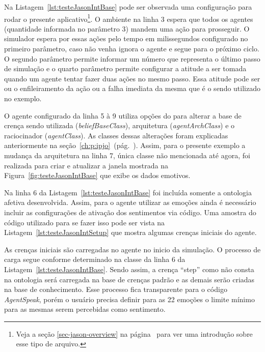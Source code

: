 Na Listagem~\ref{lst:testeJasonIntBase} pode ser observada uma configuração
para rodar o presente aplicativo\footnote{Veja a seção
\ref{sec-jason-overview} na página~\pageref{sec-jason-overview}
para ver uma introdução sobre esse tipo de arquivo.}. O ambiente na linha 3
espera que todos os agentes (quantidade informada no parâmetro 3) mandem
uma ação para prosseguir. O simulador espera por essas ações pelo tempo em milissegundos
configurado no primeiro parâmetro, caso não venha ignora o
agente e segue para o próximo ciclo. O segundo parâmetro permite informar
um número que representa o último passo de simulação e o quarto
parâmetro permite configurar a atitude a ser tomada quando um agente tentar
fazer duas ações no mesmo passo. Essa atitude pode ser ou o enfileiramento da
ação ou a falha imediata da mesma que é o sendo utilizado no exemplo.

\begin{center}
    \begin{minipage}{130mm}
	\lstset{linewidth=130mm}
	
    \end{minipage}
\end{center}

O agente configurado da linha 5 à 9 utiliza opções do \jason para
alterar a base de crença sendo utilizada (\emph{beliefBaseClass}),
arquitetura (\emph{agentArchClass}) e o raciocinador
(\emph{agentClass}). As classes dessas alterações foram explicadas anteriormente
na seção~\ref{ch:p:ipjo}~(pág.~\pageref{ch:p:ipjo}).
Assim, para o presente exemplo a mudança da arquitetura na linha 7, única
classe não mencionada até agora, foi realizada para criar e atualizar a janela
mostrada na Figura~\ref{fig:testeJasonIntBase} que exibe os dados emotivos.

Na linha 6 da Listagem~\ref{lst:testeJasonIntBase} foi incluída somente
a ontologia afetiva desenvolvida. Assim, para o agente
utilizar as emoções ainda é necessário incluir as configurações de ativação
dos sentimentos via código. Uma amostra do código utilizado para se fazer isso
pode ser vista na Listagem~\ref{lst:testeJasonIntSetup} que mostra algumas
crenças iniciais do agente.

As crenças iniciais são carregadas no agente no inicio da simulação. O processo
de carga segue conforme determinado na classe da linha 6 da
Listagem~\ref{lst:testeJasonIntBase}. Sendo assim, a crença ``step'' como não
consta na ontologia será carregada na base de crenças padrão e as demais serão
criadas na base de conhecimento. Esse processo fica transparente
para o código \emph{AgentSpeak}, porém o usuário precisa definir para as 22
emoções o limite mínimo para as mesmas serem percebidas como sentimento.

